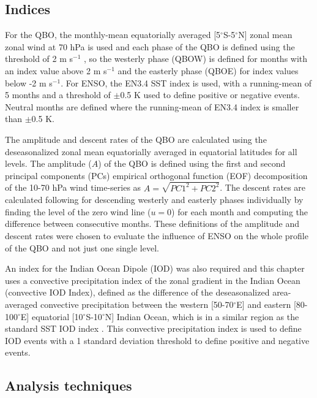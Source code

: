 \subsection{Indices}
\label{sq:indices}

For the QBO, the monthly-mean equatorially averaged [5$^\circ$S-5$^\circ$N] zonal mean zonal wind at 70 hPa is used  and each phase of the QBO is defined using the threshold of 2 m s$^{-1}$ \citep{garfinkel2010}, so the westerly phase (QBOW) is defined for months with an index value above 2 m s$^{-1}$ and the easterly phase (QBOE) for index values below -2 m s$^{-1}$. For ENSO, the EN3.4 SST index is used, with a running-mean of 5 months and a threshold of $\pm$0.5 K used to define positive or negative events. Neutral months are defined where the running-mean of EN3.4 index is smaller than $\pm$0.5 K.

The amplitude and descent rates of the QBO are calculated using the deseasonalized zonal mean equatorially averaged in equatorial latitudes for all levels. 
The amplitude ($A$) of the QBO is defined using the first and second principal components (PCs)  empirical orthogonal function (EOF) decomposition of the 10-70 hPa wind time-series \citep{serva2020} as $A=\sqrt{PC1^2+PC2^2}$.
The descent rates are calculated following \cite{schenzinger2017} for descending westerly and easterly phases individually by finding the level of the zero wind line ($u=0$) for each month and computing the difference between consecutive months.
These definitions of the amplitude and descent rates were chosen to evaluate the influence of ENSO on the whole profile of the QBO and not just one single level. 

An index for the Indian Ocean Dipole (IOD) was also required and this chapter uses a convective precipitation index of the zonal gradient in the Indian Ocean (convective IOD Index), defined as the difference of the deseasonalized area-averaged convective precipitation between the western [50-70$^\circ$E] and eastern [80-100$^\circ$E] equatorial [10$^\circ$S-10$^\circ$N] Indian Ocean, which is in a similar region as the standard SST IOD index \citep{wang2014iod}. 
This convective precipitation index is used to define IOD events with a 1 standard deviation threshold to define positive and negative events. 

\subsection{Analysis techniques}
\label{sq:analysis}

